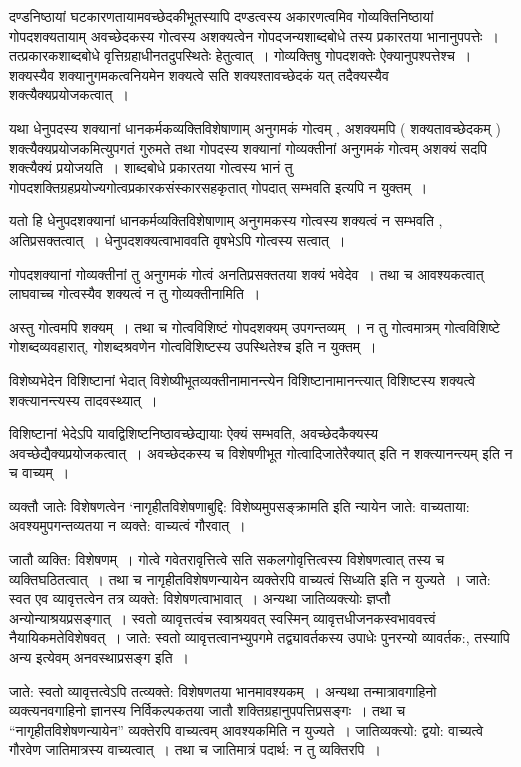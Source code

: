 {दण्डनिष्ठायां घटकारणतायामवच्छेदकीभूतस्यापि दण्डत्वस्य अकारणत्वमिव गोव्यक्ति\-निष्ठायां गोपदशक्यतायाम् अवच्छेदकस्य गोत्वस्य अशक्यत्वेन गोपदजन्यशाब्दबोधे तस्य प्रकारतया भानानुपपत्तेः~। तत्प्रकारकशाब्दबोधे वृत्तिग्रहाधीनतदुपस्थितेः हेतुत्वात्~। गोव्यक्तिषु गोपदशक्तेः ऐक्यानुपश्पत्तेश्च~। शक्यस्यैव शक्यानुगमकत्वनियमेन शक्यत्वे सति शक्यश्तावच्छेदकं यत् तदैक्यस्यैव शक्त्यैक्यप्रयोजकत्वात्~। 

यथा धेनुपदस्य शक्यानां धानकर्मकव्यक्तिविशेषाणाम् अनुगमकं गोत्वम् , अशक्यमपि ( शक्यतावच्छेदकम् ) शक्त्यैक्यप्रयोजकमित्युपगतं गुरुमते तथा गोपदस्य शक्यानां गोव्यक्तीनां अनुगमकं गोत्वम् अशक्यं सदपि शक्त्यैक्यं प्रयोजयति~। शाब्दबोधे प्रकारतया गोत्वस्य भानं तु गोपदशक्तिग्रहप्रयोज्यगोत्वप्रकारकसंस्कारसहकृतात् गोपदात् सम्भवति इत्यपि न युक्तम्~। 

यतो हि धेनुपदशक्यानां धानकर्मव्यक्तिविशेषाणाम् अनुगमकस्य गोत्वस्य शक्यत्वं न सम्भवति , अतिप्रसक्तत्वात्~। धेनुपदशक्यत्वाभाववति वृषभेऽपि गोत्वस्य सत्वात्~। 

गोपदशक्यानां गोव्यक्तीनां तु अनुगमकं गोत्वं अनतिप्रसक्ततया शक्यं भवेदेव~। तथा च आवश्यकत्वात् लाघवाच्च गोत्वस्यैव शक्यत्वं न तु गोव्यक्तीनामिति~। 

अस्तु गोत्वमपि शक्यम्~। तथा च गोत्वविशिष्टं गोपदशक्यम् उपगन्तव्यम्~। न तु गोत्वमात्रम् गोत्वविशिष्टे गोशब्दव्यवहारात्, गोशब्दश्रवणेन गोत्वविशिष्टस्य उपस्थितेश्च इति न युक्तम्~। 

विशेष्यभेदेन विशिष्टानां भेदात् विशेष्यीभूतव्यक्तीनामानन्त्येन विशिष्टानामानन्त्यात् विशिष्टस्य शक्यत्वे शक्त्यानन्त्यस्य तादवस्थ्यात्~। 

विशिष्टानां भेदेऽपि यावद्विशिष्टनिष्ठावच्छेद्यायाः ऐक्यं सम्भवति, अवच्छेदकैक्यस्य अवच्छेद्यैक्यप्रयोजकत्वात्~। अवच्छेदकस्य च विशेषणीभूत गोत्वादिजातेरैक्यात् इति न शक्त्यानन्त्यम् इति न च वाच्यम्~। 

व्यक्तौ जातेः विशेषणत्वेन ‘नागृहीतविशेषणाबुद्दि: विशेष्यमुपसङ्क्रामति इति न्यायेन जाते: वाच्यताया: अवश्यमुपगन्तव्यतया न व्यक्ते: वाच्यत्वं गौरवात्~। 

जातौ व्यक्ति: विशेषणम्~। गोत्वे गवेतरावृत्तित्वे सति सकलगोवृत्तित्वस्य विशेषणत्वात् तस्य च व्यक्तिघठितत्वात्~। तथा च नागृहीतविशेषणन्यायेन व्यक्तेरपि वाच्यत्वं सिध्यति इति न युज्यते~। जाते: स्वत एव व्यावृत्तत्वेन तत्र व्यक्ते: विशेषणत्वाभावात्~। अन्यथा जातिव्यक्त्योः ज्ञप्तौ अन्योन्याश्रयप्रसङ्गात्~। स्वतो व्यावृत्तत्वंच स्वाश्रयवत् स्वस्मिन् व्यावृत्तधीजनकस्वभाववत्त्वं नैयायिकमतेविशेषवत्~। जाते: स्वतो व्यावृत्तत्वानभ्युपगमे तद्व्यावर्तकस्य उपाधेः पुनरन्यो व्यावर्तक:, तस्यापि अन्य इत्येवम् अनवस्थाप्रसङ्ग इति~। 

जाते: स्वतो व्यावृत्तत्वेऽपि तत्व्यक्ते: विशेषणतया भानमावश्यकम्~। अन्यथा तन्मात्रावगाहिनो व्यक्त्यनवगाहिनो ज्ञानस्य निर्विकल्पकतया जातौ शक्तिग्रहानुपपत्तिप्रसङ्गः~। तथा च “नागृहीतविशेषणन्यायेन” व्यक्तेरपि वाच्यत्वम् आवश्यकमिति न युज्यते~। जातिव्यक्त्यो: द्वयो: वाच्यत्वे गौरवेण जातिमात्रस्य वाच्यत्वात्~। तथा च जातिमात्रं पदार्थ: न तु व्यक्तिरपि~। 

}
